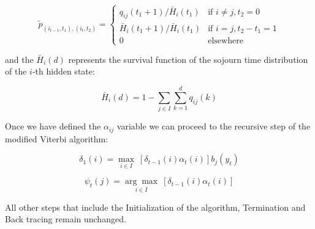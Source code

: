 \begin{equation}
    \tilde{p}_{(i_{t-1},t_1),(i_{t},t_2)} = 
    \begin{cases}
        q_{ij}(t_1+1) / \bar{H}_i(t_1) & \text{if } i \neq j, t_2 = 0 \\
        \bar{H}_i(t_1+1) / \bar{H}_i(t_1) & \text{if } i = j, t_2 - t_1 = 1 \\
        0 & \text{elsewhere} 
    \end{cases}
\end{equation}

and the $\bar{H}_i(d)$ represents the survival function of the sojourn time distribution of the $i$-th hidden state:

\begin{equation}
    \bar{H}_i(d) = 1 - \sum\limits_{j \in I}\sum\limits_{k=1}^{d} q_{ij}(k)
\end{equation}

Once we have defined the $\alpha_{ij}$ variable we can proceed to the recursive step of the modified Viterbi algorithm:

\begin{equation}
    \delta_1(i) = \underset{i \in I}{\max} \: \left[\delta_{t-1}(i) \alpha_{t}(i) \right] b_j(y_t)
\end{equation}

\begin{equation}
    \psi_t(j) = \underset{i \in I}{\arg\max} \: \left[ \delta_{t-1}(i) \alpha_{t}(i) \right] 
\end{equation}

All other steps that include the Initialization of the algorithm, Termination and Back tracing remain unchanged.